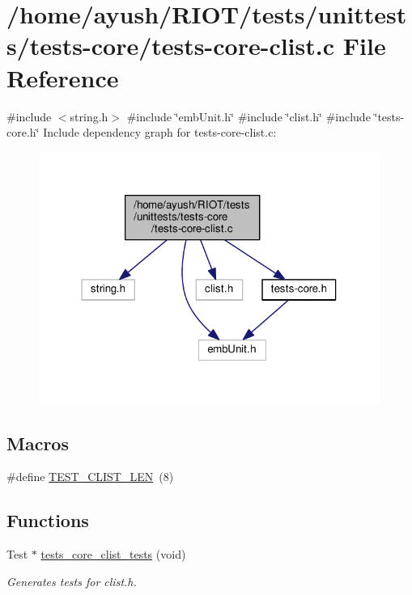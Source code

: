 \hypertarget{tests-core-clist_8c}{}\section{/home/ayush/\+R\+I\+O\+T/tests/unittests/tests-\/core/tests-\/core-\/clist.c File Reference}
\label{tests-core-clist_8c}
{\ttfamily \#include $<$string.\+h$>$}\newline
{\ttfamily \#include \char`\"{}emb\+Unit.\+h\char`\"{}}\newline
{\ttfamily \#include \char`\"{}clist.\+h\char`\"{}}\newline
{\ttfamily \#include \char`\"{}tests-\/core.\+h\char`\"{}}\newline
Include dependency graph for tests-\/core-\/clist.c\+:
\nopagebreak
\begin{figure}[H]
\begin{center}
\leavevmode
\includegraphics[width=316pt]{tests-core-clist_8c__incl}
\end{center}
\end{figure}
\subsection*{Macros}
\begin{DoxyCompactItemize}
\item 
\#define \hyperlink{tests-core-clist_8c_ad0b34c0bc2ebfbdcf8ed4ea9af7aa422}{T\+E\+S\+T\+\_\+\+C\+L\+I\+S\+T\+\_\+\+L\+EN}~(8)
\end{DoxyCompactItemize}
\subsection*{Functions}
\begin{DoxyCompactItemize}
\item 
Test $\ast$ \hyperlink{group__unittests_gac88d9e2710f9a1471a063c472ba78310}{tests\+\_\+core\+\_\+clist\+\_\+tests} (void)
\begin{DoxyCompactList}\small\item\em Generates tests for clist.\+h. \end{DoxyCompactList}\end{DoxyCompactItemize}


